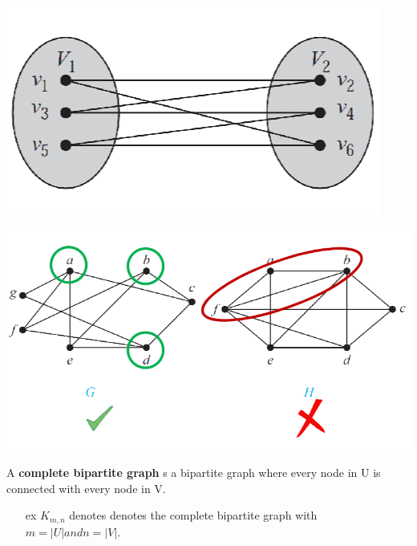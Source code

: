 \documentclass[12pt, letterpaper]{article}
\begin{document}
\begin{minipage}[t]{0.25\linewidth}
    \centering
    \strut\vspace*{-\baselineskip}\newline\includegraphics[width=\linewidth]{graphbipart.png} \bigbreak
	\strut\vspace*{-\baselineskip}\newline\includegraphics[width=\linewidth]{graphbiex.png}
\end{minipage}
\bigbreak
\begin{minipage}[t]{0.75\linewidth}
	A \textbf{complete bipartite graph} s a bipartite graph where every node in U is connected with every node in V.
	\begin{itemize}
		\item[\tiny ex] $K_{m,n}$ denotes denotes the complete bipartite graph with $m = |U| and n = |V|.$
	\end{itemize}
\end{minipage}
\end{document}
